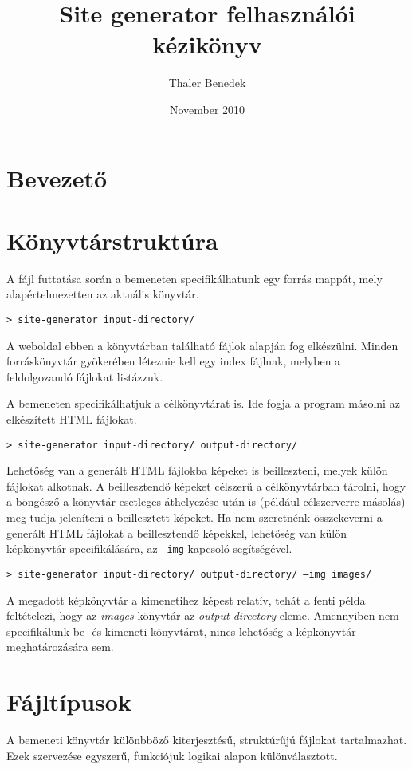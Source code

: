 \documentclass[a4paper,10pt]{article}
\title{Site generator felhasználói kézikönyv}
\author{Thaler Benedek}
\date{November 2010}
\begin{document}
\maketitle
\tableofcontents

\section{Bevezető}

\section{Könyvtárstruktúra}
A fájl futtatása során a bemeneten specifikálhatunk egy forrás mappát, mely alapértelmezetten az aktuális könyvtár. 

\texttt{> site-generator input-directory/}

A weboldal ebben a könyvtárban található fájlok alapján fog elkészülni. Minden forráskönyvtár gyökerében léteznie kell egy index fájlnak, melyben a feldolgozandó fájlokat listázzuk.

A bemeneten specifikálhatjuk a célkönyvtárat is. Ide fogja a program másolni az elkészített HTML fájlokat.

\texttt{> site-generator input-directory/ output-directory/}

Lehetőség van a generált HTML fájlokba képeket is beilleszteni, melyek külön fájlokat alkotnak. A beillesztendő képeket célszerű a célkönyvtárban tárolni, hogy a böngésző a könyvtár esetleges áthelyezése után is (például célszerverre másolás) meg tudja jeleníteni a beillesztett képeket.
Ha nem szeretnénk összekeverni a generált HTML fájlokat a beillesztendő képekkel, lehetőség van külön képkönyvtár specifikálására, az \texttt{--img} kapcsoló segítségével.

\texttt{> site-generator input-directory/ output-directory/ --img images/}

A megadott képkönyvtár a kimenetihez képest relatív, tehát a fenti példa feltételezi, hogy az \emph{images} könyvtár az \emph{output-directory} eleme.
Amennyiben nem specifikálunk be- és kimeneti könyvtárat, nincs lehetőség a képkönyvtár meghatározására sem.



\section{Fájltípusok} %
A bemeneti könyvtár különbböző kiterjesztésű, struktúrűjú fájlokat tartalmazhat. Ezek szervezése egyszerű, funkciójuk logikai alapon különválasztott.
\end{document}

